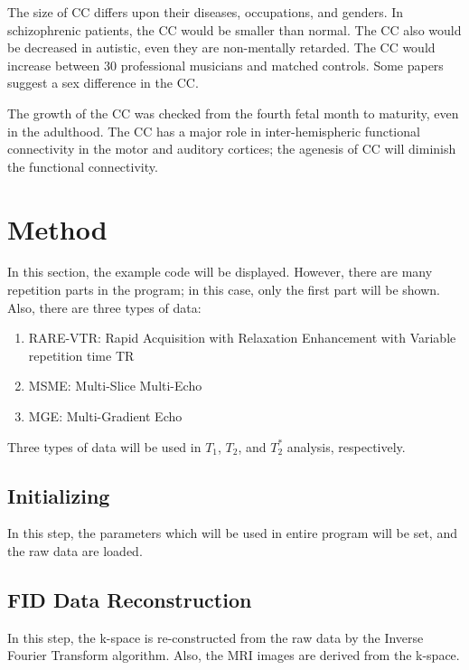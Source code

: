 \documentclass[10pt, a4paper]{article}
\begin{document}
				The size of CC differs upon their diseases, occupations, and genders. In schizophrenic patients, the CC would be smaller than normal. \cite{ref:cc2} The CC also would be decreased in autistic, even they are non-mentally retarded. \cite{ref:cc3} The CC would increase between 30 professional musicians and matched controls. \cite{ref:cc1} Some papers suggest a sex difference in the CC. \cite{ref:cc4}
				
				The growth of the CC was checked from the fourth fetal month to maturity, even in the adulthood. \cite{ref:cc5, ref:cc6} The CC has a major role in inter-hemispheric functional connectivity in the motor and auditory cortices; the agenesis of CC will diminish the functional connectivity. \cite{ref:cc7}
	
	\section{Method}
		In this section, the example code will be displayed. However, there are many repetition parts in the program; in this case, only the first part will be shown. Also, there are three types of data:
		\begin{enumerate}
			\item RARE-VTR: Rapid Acquisition with Relaxation Enhancement with Variable repetition time TR
			\item MSME: Multi-Slice Multi-Echo
			\item MGE: Multi-Gradient Echo
		\end{enumerate}
		Three types of data will be used in $T_1$, $T_2$, and $T_2^*$ analysis, respectively.
	
		\subsection{Initializing}
			In this step, the parameters which will be used in entire program will be set, and the raw data are loaded. 
			
			
	
		\subsection{FID Data Reconstruction}
			In this step, the k-space is re-constructed from the raw data by the Inverse Fourier Transform algorithm. Also, the MRI images are derived from the k-space. 
		
			
		
\end{document}
